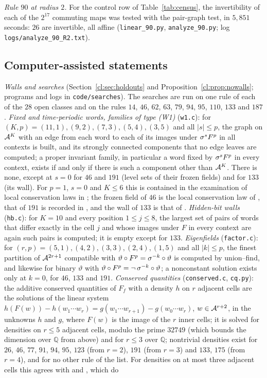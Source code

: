 \emph{Rule $90$ at radius $2$.} For the control row of Table~\ref{tab:census}, the invertibility of each of the $2^{17}$ commuting maps was tested with the pair-graph test, in $5{,}851$ seconds: $26$ are invertible, all affine (\texttt{linear\_90.py}, \texttt{analyze\_90.py}; log \texttt{logs/analyze\_90\_R2.txt}).

\subsection{Computer-assisted statements}\label{app:stated}

\emph{Walls and searches} (Section~\ref{cl:sec:holdouts} and Proposition~\ref{cl:prop:nowalls}; programs and logs in \texttt{code/searches}). The searches are run on one rule of each of the $28$ open classes and on the rules $14$, $46$, $62$, $63$, $79$, $94$, $95$, $110$, $133$ and $187$. \emph{Fixed and time-periodic words, families of type (W1)} (\texttt{w1.c}): for $(K,p)=(11,1),(9,2),(7,3),(5,4),(3,5)$ and all $|s|\le p$, the graph on $\mathcal{A}^K$ with an edge from each word to each of its images under $\sigma^sF^p$ in all contexts is built, and its strongly connected components that no edge leaves are computed; a proper invariant family, in particular a word fixed by $\sigma^sF^p$ in every context, exists if and only if there is such a component other than $\mathcal{A}^K$. There is none, except at $s=0$ for $46$ and $191$ (level sets of their frozen fields) and for $133$ (its wall). For $p=1$, $s=0$ and $K\le6$ this is contained in the examination of local conservation laws in \cite[Section~4]{Takesue1989}; the frozen field of $46$ is the local conservation law of \cite[(4.4)--(4.6)]{Takesue1989}, that of $191$ is recorded in \cite[Table~3]{HT1991}, and the wall of $133$ is that of \cite[p.~391]{Takesue1989}. \emph{Hidden-bit walls} (\texttt{hb.c}): for $K=10$ and every position $1\le j\le8$, the largest set of pairs of words that differ exactly in the cell $j$ and whose images under $F$ in every context are again such pairs is computed; it is empty except for $133$. \emph{Eigenfields} (\texttt{factor.c}): for $(r,p)=(5,1),(4,2),(3,3),(2,4),(1,5)$ and all $|k|\le p$, the finest partition of $\mathcal{A}^{2r+1}$ compatible with $\vartheta\circ F^p=\sigma^{-k}\circ\vartheta$ is computed by union--find, and likewise for binary $\vartheta$ with $\vartheta\circ F^p=\neg\,\sigma^{-k}\circ\vartheta$; a nonconstant solution exists only at $k=0$, for $46$, $133$ and $191$. \emph{Conserved quantities} (\texttt{conserved.c}, \texttt{cq.py}): the additive conserved quantities of $F_f$ with a density $h$ on $r$ adjacent cells are the solutions of the linear system $h(F(w))-h(w_1\cdots w_r)=g(w_1\cdots w_{r+1})-g(w_0\cdots w_r)$, $w\in\mathcal{A}^{r+2}$, in the unknowns $h$ and $g$, where $F(w)$ is the image of the $r$ inner cells; it is solved for densities on $r\le5$ adjacent cells, modulo the prime $32749$ (which bounds the dimension over $\mathbb Q$ from above) and for $r\le3$ over $\mathbb Q$; nontrivial densities exist for $26$, $46$, $77$, $91$, $94$, $95$, $123$ (from $r=2$), $191$ (from $r=3$) and $133$, $175$ (from $r=4$), and for no other rule of the list. For densities on at most three adjacent cells this agrees with \cite[Table~3]{HT1991} and \cite[Table~5]{Takesue1995}, which do 